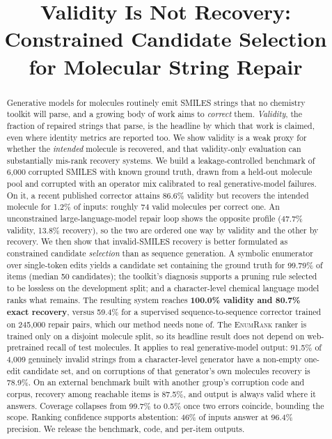 \documentclass[conference]{IEEEtran}
\title{\bfseries Validity Is Not Recovery:\\Constrained Candidate Selection\\for Molecular String Repair}
\author{
\IEEEauthorblockN{Sridhara Syam Chandrabhotla}
\IEEEauthorblockA{Independent Researcher\\Bhimavaram, India\\
\texttt{11sridharasyam@gmail.com}}
\and
\IEEEauthorblockN{KPK Lalitha Vitala}
\IEEEauthorblockA{Dept.\ of Electronics and Communications\\
Vishnu Institute of Technology\\
Bhimavaram, India\\
\texttt{lalitha.v@vishnu.edu.in}}
\and
\IEEEauthorblockN{S.\ Diwakar Bhagavathula}
\IEEEauthorblockA{Dept.\ of Chemistry\\
SRKR Engineering College\\
Bhimavaram, India\\
\texttt{diwakar.b@srkrec.edu.in}}
}
\newcommand{\ours}{\textsc{EnumRank}}
\begin{document}
\maketitle
\vspace{-2.5em}

\begin{abstract}
\noindent
Generative models for molecules routinely emit SMILES strings that no chemistry
toolkit will parse, and a growing body of work aims to \emph{correct} them.
\emph{Validity}, the fraction of repaired strings that parse, is the headline by
which that work is claimed, even where identity metrics are reported too. We show
validity is a weak proxy for whether the \emph{intended} molecule is recovered,
and that validity-only evaluation can substantially mis-rank recovery systems.
We build a leakage-controlled benchmark of 6{,}000 corrupted SMILES with known
ground truth, drawn from a held-out molecule pool and corrupted with an operator
mix calibrated to real generative-model failures. On
it, a recent published corrector attains 86.6\% validity but recovers the
intended molecule for 1.2\% of inputs: roughly 74 valid molecules per correct
one. An unconstrained large-language-model repair loop shows the opposite profile
(47.7\% validity, 13.8\% recovery), so the two are ordered one way by validity
and the other by recovery.
We then show that invalid-SMILES recovery is better formulated as constrained
candidate \emph{selection} than as sequence generation. A symbolic
enumerator over single-token edits yields a candidate set containing the ground
truth for 99.79\% of items (median 50 candidates); the toolkit's diagnosis
supports a pruning rule selected to be lossless on the development split; and a
character-level chemical language model ranks what remains.
The resulting system reaches \textbf{100.0\% validity and 80.7\% exact
recovery}, versus 59.4\% for a supervised sequence-to-sequence corrector trained
on 245{,}000 repair pairs, which our method needs none of.
The \ours{} ranker is trained only on a disjoint molecule split, so its headline
result does not depend on web-pretrained recall of test molecules. It applies to
real generative-model output: 91.5\% of 4{,}009 genuinely invalid strings from
a character-level generator have a non-empty one-edit candidate set, and on
corruptions of that generator's own molecules recovery is 78.9\%. On an external benchmark built with another group's corruption code and corpus,
recovery among reachable items is 87.5\%, and output is always valid where it
answers.
Coverage collapses from 99.7\% to 0.5\% once two errors coincide, bounding the
scope. Ranking confidence supports abstention: 46\% of inputs answer at 96.4\%
precision. We release the benchmark, code, and per-item outputs.
\end{abstract}
\end{document}
